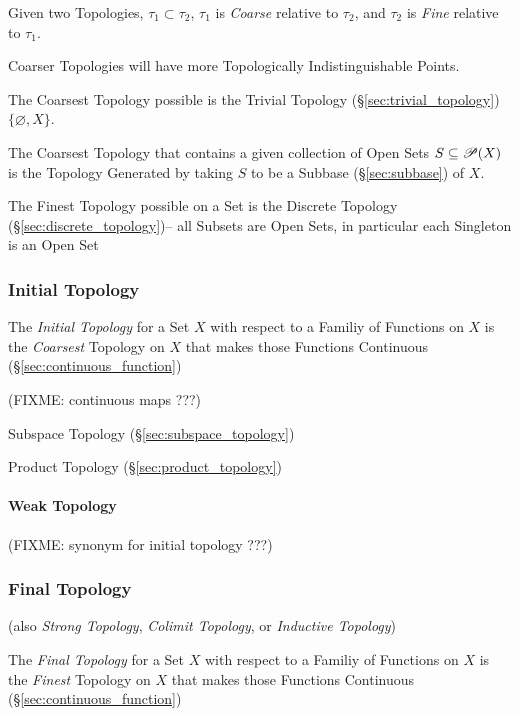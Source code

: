 Given two Topologies, $\tau_1 \subset \tau_2$, $\tau_1$ is
\emph{Coarse} relative to $\tau_2$, and $\tau_2$ is \emph{Fine}
relative to $\tau_1$.

Coarser Topologies will have more Topologically Indistinguishable
Points.

The Coarsest Topology possible is the Trivial Topology
(\S\ref{sec:trivial_topology}) $\{ \varnothing, X \}$.

The Coarsest Topology that contains a given collection of Open Sets $S
\subseteq \mathscr{P}(X)$ is the Topology Generated by taking $S$ to
be a Subbase (\S\ref{sec:subbase}) of $X$.

The Finest Topology possible on a Set is the Discrete Topology
(\S\ref{sec:discrete_topology})-- all Subsets are Open Sets, in particular each
Singleton is an Open Set



\subsubsection{Initial Topology}\label{sec:initial_topology}

The \emph{Initial Topology} for a Set $X$ with respect to a Familiy of
Functions on $X$ is the \emph{Coarsest} Topology on $X$ that makes those
Functions Continuous (\S\ref{sec:continuous_function})

(FIXME: continuous maps ???)

Subspace Topology (\S\ref{sec:subspace_topology})

Product Topology (\S\ref{sec:product_topology})



\paragraph{Weak Topology}\label{sec:weak_topology}

(FIXME: synonym for initial topology ???)



\subsubsection{Final Topology}\label{sec:final_topology}

(also \emph{Strong Topology}, \emph{Colimit Topology}, or
\emph{Inductive Topology})

The \emph{Final Topology} for a Set $X$ with respect to a Familiy of
Functions on $X$ is the \emph{Finest} Topology on $X$ that makes those
Functions Continuous (\S\ref{sec:continuous_function})

